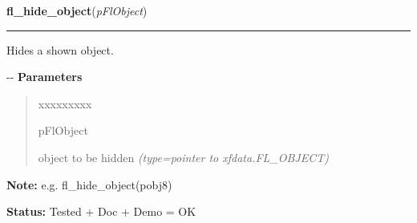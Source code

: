 \hspace{.8\funcindent}\begin{boxedminipage}{\funcwidth}

    \raggedright \textbf{fl\_hide\_object}(\textit{pFlObject})

    \vspace{-1.5ex}

    \rule{\textwidth}{0.5\fboxrule}
\setlength{\parskip}{2ex}

Hides a shown object.

-{}-
\setlength{\parskip}{1ex}
      \textbf{Parameters}
      \vspace{-1ex}

      \begin{quote}
        \begin{Ventry}{xxxxxxxxx}

          \item[pFlObject]


object to be hidden
            {\it (type=pointer to xfdata.FL\_OBJECT)}

        \end{Ventry}

      \end{quote}

\textbf{Note:} 
e.g. fl\_hide\_object(pobj8)


\textbf{Status:} 
Tested + Doc + Demo = OK


    \end{boxedminipage}

    \label{xformslib:flbasic:fl_object_is_visible}

    \vspace{0.5ex}

